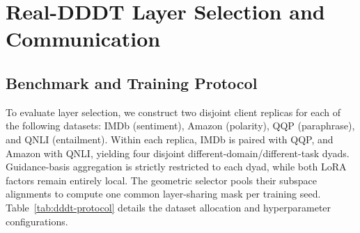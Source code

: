 \documentclass[11pt,letterpaper]{article}
\begin{document}
\FloatBarrier

\section{Real-DDDT Layer Selection and Communication}
\label{app:layer-selection}

\subsection{Benchmark and Training Protocol}
To evaluate layer selection, we construct two disjoint client replicas for each of the following datasets: IMDb (sentiment), Amazon (polarity), QQP (paraphrase), and QNLI (entailment). Within each replica, IMDb is paired with QQP, and Amazon with QNLI, yielding four disjoint different-domain/different-task dyads. Guidance-basis aggregation is strictly restricted to each dyad, while both LoRA factors remain entirely local. The geometric selector pools their subspace alignments to compute one common layer-sharing mask per training seed. Table~\ref{tab:dddt-protocol} details the dataset allocation and hyperparameter configurations.
\end{document}
